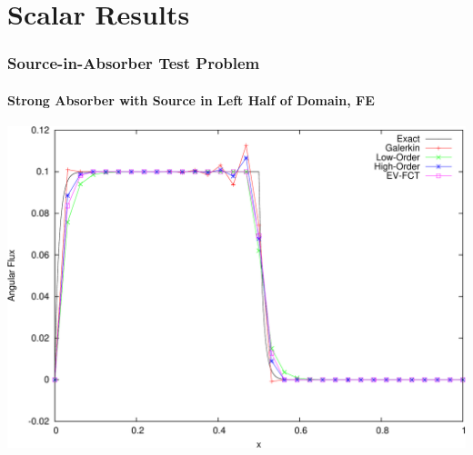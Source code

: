 \section{Scalar Results}
\begin{frame}
\frametitle{Source-in-Absorber Test Problem}
\framesubtitle{Strong Absorber with Source in Left Half of Domain, FE}

\begin{center}
\includegraphics[height=0.8\textheight]{./figures/solutions_source_FE.pdf}
\end{center}

\end{frame}
